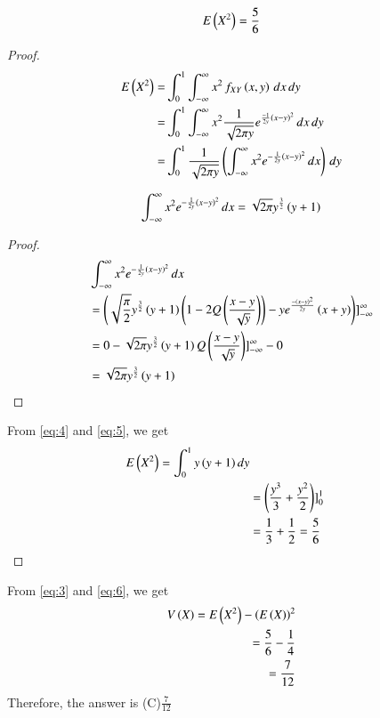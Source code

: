 \documentclass[journal,12pt,twocolumn]{IEEEtran}
\begin{document}
\begin{lemma}
\begin{align}
E\left(X^2\right) = \frac{5}{6}
\end{align}
\end{lemma}
\begin{proof}
\begin{align}
 E\left(X^2\right)=&\int_{0}^{1}\int_{-\infty}^{\infty}x^2\,f_{XY}\left(x, y\right)\,dx\,dy\\   
 =&\int_{0}^{1}\int_{-\infty}^{\infty}x^2\frac{1}{\sqrt{2\pi y}}e^{\frac{-1}{2y}\left(x-y\right)^2}\,dx \,dy\\
 =&\int_{0}^{1}\frac{1}{\sqrt{2\pi y}}\left(\int_{-\infty}^{\infty}x^2e^{-\frac{1}{2y}\left(x-y\right)^2}\,dx\right)\,dy
 \label{eq:4}
\end{align}
\begin{lemma}
\begin{align}
\int_{-\infty}^{\infty}x^2e^{-\frac{1}{2y}\left(x-y\right)^2}\,dx=\sqrt{2\pi}y^\frac{3}{2}\left(y+1\right)
\end{align}
\end{lemma} 
\begin{proof}
\begin{align}
&\int_{-\infty}^{\infty}x^2e^{-\frac{1}{2y}\left(x-y\right)^2}\,dx\\
&=\left(\sqrt{\frac{\pi}{2}}y^\frac{3}{2}\left(y+1\right)\left(1-2Q\left(\frac{x-y}{\sqrt{y}}\right)\right) - ye^\frac{-\left(x-y\right)^2}{2y}\left(x+y\right)\right)]_{-\infty}^{\infty}\\
&=0-\sqrt{2\pi}y^\frac{3}{2}\left(y+1\right)Q\left(\frac{x-y}{\sqrt{y}}\right)]_{-\infty}^{\infty} - 0\\
&=\sqrt{2\pi}y^\frac{3}{2}\left(y+1\right) \label{eq:5}
\end{align}
\end{proof}
From \eqref{eq:4} and \eqref{eq:5}, we get
\begin{align}
E\left(X^2\right) = \int_{0}^{1}y\left(y+1\right)dy\\
&=\left(\frac{y^3}{3}+\frac{y^2}{2}\right)]_{0}^{1}\\
&=\frac{1}{3}+\frac{1}{2}=\frac{5}{6} \label{eq:6}
\end{align}
\end{proof}
From \eqref{eq:3} and \eqref{eq:6}, we get
\begin{align}
V\left(X\right) = E\left(X^2\right) - \left(E\left(X\right)\right)^2\\
     = \frac{5}{6} - \frac{1}{4}\\
     = \frac{7}{12}
\end{align}
Therefore, the answer is (C)$\frac{7}{12}$
\end{document}
